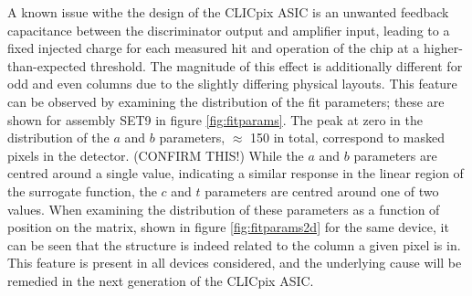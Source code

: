 A known issue withe the design of the CLICpix ASIC is an unwanted feedback capacitance between the discriminator output and amplifier input, leading to a fixed injected charge for each measured hit and operation of the chip at a higher-than-expected threshold. The magnitude of this effect is additionally different for odd and even columns due to the slightly differing physical layouts. This feature can be observed by examining the distribution of the fit parameters;  these are shown for assembly SET9 in figure \ref{fig:fitparams}.  The peak at zero in the distribution of the $a$ and $b$ parameters, $\approx$ 150 in total, correspond to masked pixels in the detector. (CONFIRM THIS!) While the $a$ and $b$ parameters are centred around a single value, indicating a similar response in the linear region of the surrogate function, the $c$ and $t$ parameters are centred around one of two values.  When examining the distribution of these parameters as a function of position on the matrix, shown in figure \ref{fig:fitparams2d} for the same device, it can be seen that the structure is indeed related to the column a given pixel is in.  This feature is present in all devices considered, and the underlying cause will be remedied in the next generation of the CLICpix ASIC.

